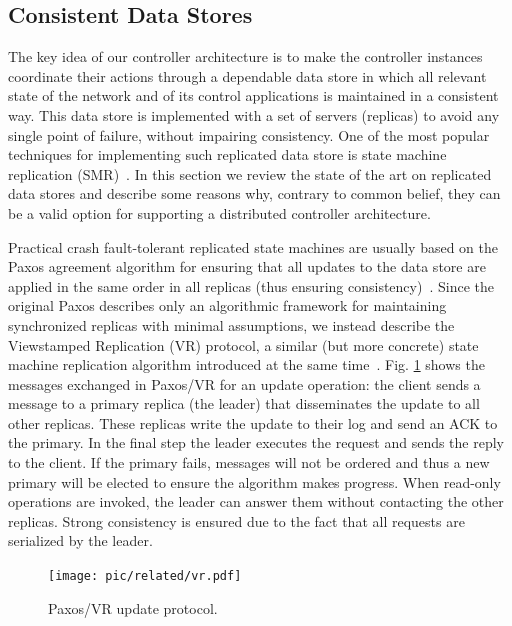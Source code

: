 \begin{itemize}

\section{Consistent Data Stores}
\glsresetall
\label{sec:relatedWork:consistentDataStore}
The key idea of our controller architecture is to make the controller instances coordinate their actions through a dependable data store in which all relevant state of the network and of its control applications is maintained in a consistent way.
This data store is implemented with a set of servers (replicas) to avoid any single point of failure, without impairing consistency.
One of the most popular techniques for implementing such replicated data store is state machine replication (SMR)~\cite{Sch90,Lam98}.
In this section we review the state of the art on replicated data stores and describe some reasons why, contrary to common belief, they can be a valid option for supporting a distributed controller architecture.

Practical crash fault-tolerant replicated state machines are usually based on the Paxos agreement algorithm for ensuring that all updates to the data store are applied in the same order in all replicas (thus ensuring consistency)~\cite{Lam98}.
Since the original Paxos describes only an algorithmic framework for maintaining synchronized replicas with minimal assumptions, we instead describe the Viewstamped Replication (VR) protocol, a similar (but more concrete) state machine replication algorithm introduced at the same time~\cite{reitblatt2012abstractions}.
Fig. \ref{fig:paxos} shows the messages exchanged in Paxos/VR for an update operation: the client sends a message to a primary replica (the leader) that disseminates the update to all other replicas. These replicas write the update to their log and send an ACK to the primary.
In the final step the leader executes the request and sends the reply to the client.
If the primary fails, messages will not be ordered and thus a new primary will be elected to ensure the algorithm makes progress.
When read-only operations are invoked, the leader can answer them without contacting the other replicas.
Strong consistency is ensured due to the fact that all requests are serialized by the leader.

\begin{figure}[!ht]
\centering
\texttt{[image: pic/related/vr.pdf]}
\caption[Paxos/VR update protocol]{Paxos/VR update protocol.} 
\label{fig:paxos} 
\end{figure}


\end{itemize}
